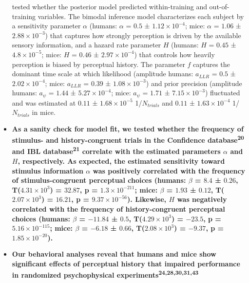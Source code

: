\documentclass[
]{article}
\begin{document}
\begin{itemize}
{  tested whether the posterior model predicted within-training and
  out-of-training variables. The bimodal inference model characterizes
  each subject by a sensitivity parameter \(\alpha\) (humans: \(\alpha\)
  = \(0.5\) ± \(\ensuremath{1.12\times 10^{-4}}\); mice: \(\alpha\) =
  \(1.06\) ± \(\ensuremath{2.88\times 10^{-3}}\)) that captures how
  strongly perception is driven by the available sensory information,
  and a hazard rate parameter \(H\) (humans: \(H\) = \(0.45\) ±
  \(\ensuremath{4.8\times 10^{-5}}\); mice: \(H\) = \(0.46\) ±
  \(\ensuremath{2.97\times 10^{-4}}\)) that controls how heavily
  perception is biased by perceptual history. The parameter \(f\)
  captures the dominant time scale at which likelihood (amplitude
  humans: \(a_{LLR}\) = \(0.5\) ± \(\ensuremath{2.02\times 10^{-4}}\);
  mice: \(a_{LLR}\) = \(0.39\) ± \(\ensuremath{1.08\times 10^{-3}}\))
  and prior precision (amplitude humans: \(a_{\psi}\) = \(1.44\) ±
  \(\ensuremath{5.27\times 10^{-4}}\); mice: \(a_{\psi}\) = \(1.71\) ±
  \(\ensuremath{7.15\times 10^{-3}}\)) fluctuated and was estimated at
  \(0.11\) ± \(\ensuremath{1.68\times 10^{-5}}\) 1/\(N_{trials}\) and
  \(0.11\) ± \(\ensuremath{1.63\times 10^{-4}}\) 1/\(N_{trials}\) in
  mice.}
\item
  \textbf{As a sanity check for model fit, we tested whether the
  frequency of stimulus- and history-congruent trials in the Confidence
  database\textsuperscript{20} and IBL database\textsuperscript{21}
  correlate with the estimated parameters \(\alpha\) and \(H\),
  respectively. As expected, the estimated sensitivity toward stimulus
  information \(\alpha\) was positively correlated with the frequency of
  stimulus-congruent perceptual choices (humans: \(\beta\) = \(8.4\) ±
  \(0.26\), T(\(\ensuremath{4.31\times 10^{3}}\)) = \(32.87\), p =
  \(\ensuremath{1.3\times 10^{-211}}\); mice: \(\beta\) = \(1.93\) ±
  \(0.12\), T(\(\ensuremath{2.07\times 10^{3}}\)) = \(16.21\), p =
  \(\ensuremath{9.37\times 10^{-56}}\)). Likewise, \(H\) was negatively
  correlated with the frequency of history-congruent perceptual choices
  (humans: \(\beta\) = \(-11.84\) ± \(0.5\),
  T(\(\ensuremath{4.29\times 10^{3}}\)) = \(-23.5\), p =
  \(\ensuremath{5.16\times 10^{-115}}\); mice: \(\beta\) = \(-6.18\) ±
  \(0.66\), T(\(\ensuremath{2.08\times 10^{3}}\)) = \(-9.37\), p =
  \(\ensuremath{1.85\times 10^{-20}}\)).}
\item
  \textbf{Our behavioral analyses reveal that humans and mice show
  significant effects of perceptual history that impaired performance in
  randomized psychophysical experiments\textsuperscript{24,28,30,31,43}
}
\end{itemize}
\end{document}
